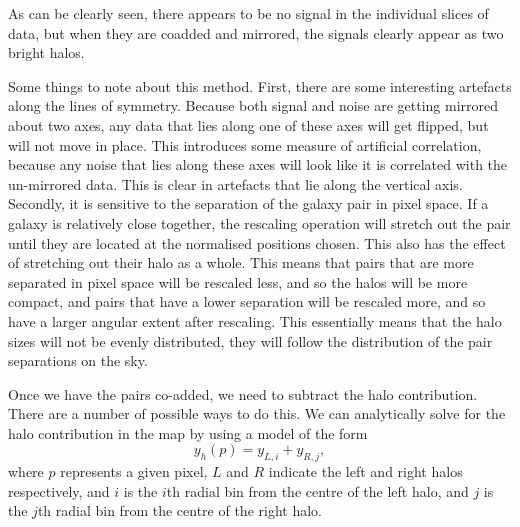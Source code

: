 As can be clearly seen, there appears to be no signal in the individual slices of data, but when they are coadded and mirrored, the signals clearly appear as two bright halos. 

Some things to note about this method. First, there are some interesting artefacts along the lines of symmetry. Because both signal and noise are getting mirrored about two axes, any data that lies along one of these axes will get flipped, but will not move in place. This introduces some measure of artificial correlation, because any noise that lies along these axes will look like it is correlated with the un-mirrored data. This is clear in artefacts that lie along the vertical axis. 
Secondly, it is sensitive to the separation of the galaxy pair in pixel space. If a galaxy is relatively close together, the rescaling operation will stretch out the pair until they are located at the normalised positions chosen. This also has the effect of stretching out their halo as a whole. This means that pairs that are more separated in pixel space will be rescaled less, and so the halos will be more compact, and pairs that have a lower separation will be rescaled more, and so have a larger angular extent after rescaling. This essentially means that the halo sizes will not be evenly distributed, they will follow the distribution of the pair separations on the sky.  

\par Once we have the pairs co-added, we need to subtract the halo contribution. There are a number of possible ways to do this. We can analytically solve for the halo contribution in the map by using a model of the form 
\begin{equation}
y_h(p) = y_{L,i} + y_{R,j},
\end{equation}
where $p$ represents a given pixel, $L$ and $R$ indicate the left and right halos respectively, and $i$ is the $i$th radial bin from the centre of the left halo, and $j$ is the $j$th radial bin from the centre of the right halo. 





